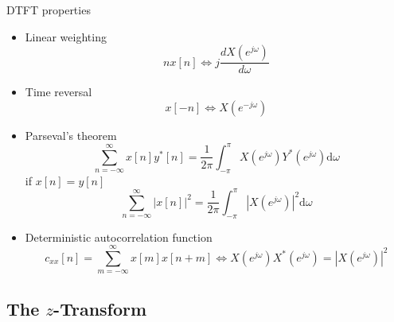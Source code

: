 \documentclass[10pt]{beamer}
\begin{document}
%
\begin{frame}{DTFT properties}
\begin{itemize}
	\item Linear weighting
		\begin{equation*}
		nx[n] \Longleftrightarrow j\frac{dX(e^{j\omega})}{d\omega}
		\end{equation*}
	\item Time reversal
		\begin{equation*}
		x[-n] \Longleftrightarrow X(e^{-j\omega})
		\end{equation*}
	\item Parseval's theorem
		\begin{equation*}
		\sum_{n=-\infty}^{\infty}x[n]y^*[n] = \frac{1}{2\pi}\int_{-\pi}^{\pi}X(e^{j\omega})Y^*(e^{j\omega})\mathrm{d}\omega
		\end{equation*}
		if $x[n] = y[n]$
		\begin{equation*}\tag{signal energy}
		\sum_{n=-\infty}^{\infty}|x[n]|^2 = \frac{1}{2\pi}\int_{-\pi}^{\pi}|X(e^{j\omega})|^2\mathrm{d}\omega
		\end{equation*}	
	\item Deterministic autocorrelation function
		\begin{equation*}
		c_{xx}[n] = \sum_{m=-\infty}^{\infty}x[m]x[n+m] \Longleftrightarrow X(e^{j\omega})X^*(e^{j\omega}) = |X(e^{j\omega})|^2
		\end{equation*}	
\end{itemize}
\end{frame}

%
\subsection{The $z$-Transform}
\end{document}
